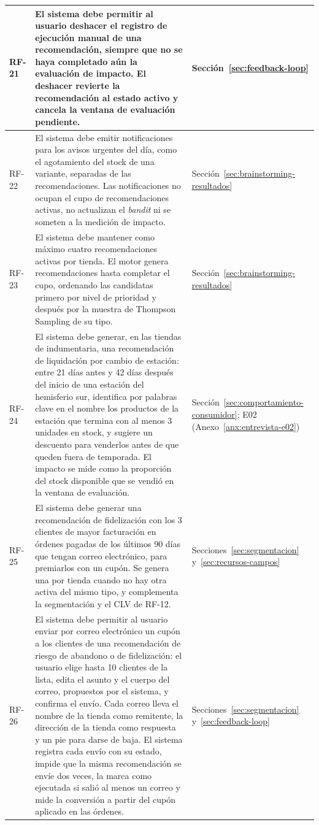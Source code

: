 \begin{longtable}{|m{1.7cm}|m{10.6cm}|m{2.7cm}|}
RF-21 & El sistema debe permitir al usuario deshacer el registro de ejecución manual de una recomendación, siempre que no se haya completado aún la evaluación de impacto. El deshacer revierte la recomendación al estado activo y cancela la ventana de evaluación pendiente. & Sección~\ref{sec:feedback-loop} \\
\hline

RF-22 & El sistema debe emitir notificaciones para los avisos urgentes del día, como el agotamiento del stock de una variante, separadas de las recomendaciones. Las notificaciones no ocupan el cupo de recomendaciones activas, no actualizan el \emph{bandit} ni se someten a la medición de impacto. & Sección~\ref{sec:brainstorming-resultados} \\
\hline

RF-23 & El sistema debe mantener como máximo cuatro recomendaciones activas por tienda. El motor genera recomendaciones hasta completar el cupo, ordenando las candidatas primero por nivel de prioridad y después por la muestra de Thompson Sampling de su tipo. & Sección~\ref{sec:brainstorming-resultados} \\
\hline

RF-24 & El sistema debe generar, en las tiendas de indumentaria, una recomendación de liquidación por cambio de estación: entre 21 días antes y 42 días después del inicio de una estación del hemisferio sur, identifica por palabras clave en el nombre los productos de la estación que termina con al menos 3 unidades en stock, y sugiere un descuento para venderlos antes de que queden fuera de temporada. El impacto se mide como la proporción del stock disponible que se vendió en la ventana de evaluación. & Sección~\ref{sec:comportamiento-consumidor}; E02 (Anexo~\ref{anx:entrevista-e02}) \\
\hline

RF-25 & El sistema debe generar una recomendación de fidelización con los 3 clientes de mayor facturación en órdenes pagadas de los últimos 90 días que tengan correo electrónico, para premiarlos con un cupón. Se genera una por tienda cuando no hay otra activa del mismo tipo, y complementa la segmentación y el CLV de RF-12. & Secciones~\ref{sec:segmentacion} y~\ref{sec:recursos-campos} \\
\hline

RF-26 & El sistema debe permitir al usuario enviar por correo electrónico un cupón a los clientes de una recomendación de riesgo de abandono o de fidelización: el usuario elige hasta 10 clientes de la lista, edita el asunto y el cuerpo del correo, propuestos por el sistema, y confirma el envío. Cada correo lleva el nombre de la tienda como remitente, la dirección de la tienda como respuesta y un pie para darse de baja. El sistema registra cada envío con su estado, impide que la misma recomendación se envíe dos veces, la marca como ejecutada si salió al menos un correo y mide la conversión a partir del cupón aplicado en las órdenes. & Secciones~\ref{sec:segmentacion} y~\ref{sec:feedback-loop} \\
\hline


\end{longtable}
